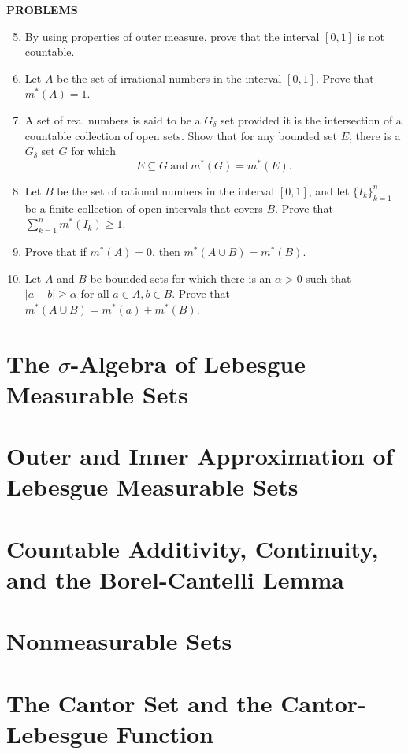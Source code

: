 \documentclass[a4paper,10pt]{book}
\theoremstyle{plain} %
\begin{document}
\begin{center}
	\textbf{PROBLEMS}
\end{center}
\begin{enumerate}
	\setcounter{enumi}{4}
	\item By using properties of outer measure, prove that the interval $[0,1]$ is not countable.
	\item Let $A$ be the set of irrational numbers in the interval $[0,1]$. Prove that $m^*(A)=1$.
	\item A set of real numbers is said to be a $G_\delta$ set provided it is the intersection of a countable collection of open sets.
	Show that for any bounded set $E$, there is a $G_\delta$ set $G$ for which
	\[E\subseteq G \ \text{and}\ m^*(G)=m^*(E).\]
	\item Let $B$ be the set of rational numbers in the interval $[0,1]$, and let $\{I_k\}_{k=1}^n$ be a finite collection of open intervals that covers $B$.
	Prove that $\textstyle \sum_{k=1}^n m^*(I_k) \ge 1$.
	\item Prove that if $m^*(A)=0$, then $m^*(A\cup B) = m^*(B)$.
	\item Let $A$ and $B$ be bounded sets for which there is an $\alpha >0$ such that $|a-b| \ge \alpha$ for all $a \in A, b \in B$.
	Prove that $m^*(A \cup B) = m^*(a)+m^*(B)$.
\end{enumerate}




\section{The $\sigma$-Algebra of Lebesgue Measurable Sets}
\section{Outer and Inner Approximation of Lebesgue Measurable Sets}
\section{Countable Additivity, Continuity, and the Borel-Cantelli Lemma}
\section{Nonmeasurable Sets}
\section{The Cantor Set and the Cantor-Lebesgue Function}
\end{document}
